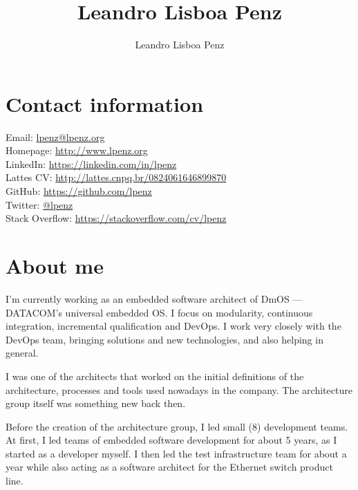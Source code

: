 \documentclass[margin,line]{resume}
\title{Leandro Lisboa Penz}
\author{Leandro Lisboa Penz}
\begin{document}
\newcommand{\nl}[0]{\vspace{1mm}\\}

\begin{resume}


    \section{\mysidestyle Contact information}

    Email: \hfill \href{mailto:lpenz@lpenz.org}{lpenz@lpenz.org} \\

    Homepage: \hfill \url{http://www.lpenz.org} \\
    LinkedIn: \hfill \url{https://linkedin.com/in/lpenz} \\
    Lattes CV: \hfill \url{http://lattes.cnpq.br/0824061646899870} \\
    GitHub: \hfill \url{https://github.com/lpenz} \\
    Twitter: \hfill \href{https://twitter.com/lpenz}{@lpenz} \\
    Stack Overflow: \hfill \url{https://stackoverflow.com/cv/lpenz}


    \section{\mysidestyle About me}

    I'm currently working as an embedded software architect of DmOS ---
DATACOM's universal embedded OS. I focus on modularity, continuous
integration, incremental qualification and DevOps. I work very closely
with the DevOps team, bringing solutions and new technologies, and also
helping in general.

I was one of the architects that worked on the initial definitions of
the architecture, processes and tools used nowadays in the company. The
architecture group itself was something new back then.

Before the creation of the architecture group, I led small (8)
development teams. At first, I led teams of embedded software
development for about 5 years, as I started as a developer myself. I
then led the test infrastructure team for about a year while also acting
as a software architect for the Ethernet switch product line.


\end{resume}
\end{document}
